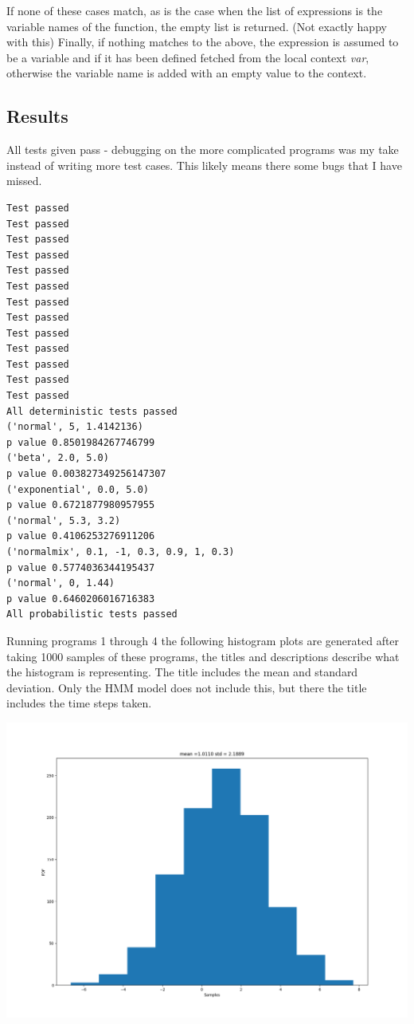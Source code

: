 \documentclass[]{article}
\begin{document}
If none of these cases match, as is the case when the list of expressions is the variable names of the function, the empty list is returned. (Not exactly happy with this)
\newpage
Finally, if nothing matches to the above, the expression is assumed to be a variable and if it has been defined fetched from the local context \emph{var}, otherwise the variable name is added with an empty value to the context.



\subsection{Results}
All tests given pass - debugging on the more complicated programs was my take instead of writing more test cases. This likely means there some bugs that I have missed.
\begin{verbatim}
Test passed
Test passed
Test passed
Test passed
Test passed
Test passed
Test passed
Test passed
Test passed
Test passed
Test passed
Test passed
Test passed
All deterministic tests passed
('normal', 5, 1.4142136)
p value 0.8501984267746799
('beta', 2.0, 5.0)
p value 0.003827349256147307
('exponential', 0.0, 5.0)
p value 0.6721877980957955
('normal', 5.3, 3.2)
p value 0.4106253276911206
('normalmix', 0.1, -1, 0.3, 0.9, 1, 0.3)
p value 0.5774036344195437
('normal', 0, 1.44)
p value 0.6460206016716383
All probabilistic tests passed
\end{verbatim}
\newpage
Running programs 1 through 4 the following histogram plots are generated after taking 1000 samples of these programs, the titles and descriptions describe what the histogram is representing. The title includes the mean and standard deviation. Only the HMM model does not include this, but there the title includes the time steps taken.

	\begin{center}
		\includegraphics[width=\textwidth]{Eval/GaussianUnitTest.png}
	\end{center}
\end{document}
